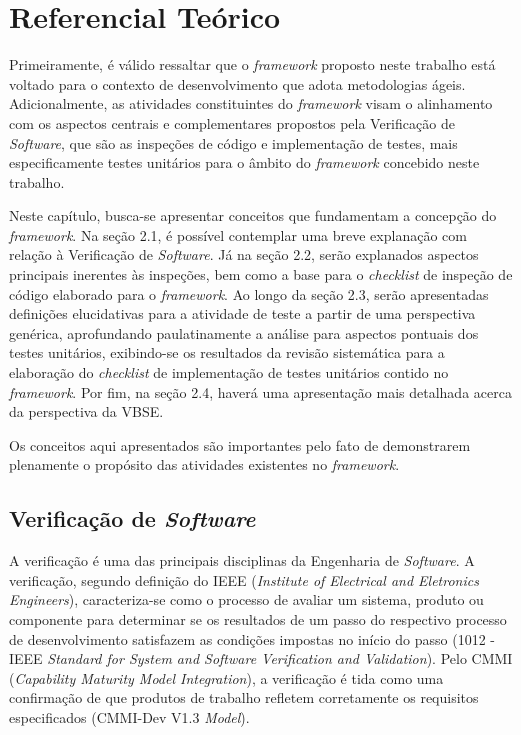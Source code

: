 \chapter{Referencial Teórico}

Primeiramente, é válido ressaltar que o \textit{framework} proposto neste trabalho está voltado para o contexto de desenvolvimento que adota metodologias ágeis. Adicionalmente, as atividades constituintes do \textit{framework} visam o alinhamento com os aspectos centrais e complementares propostos pela Verificação de \textit{Software}, que são as inspeções de código e implementação de testes, mais especificamente testes unitários para o âmbito do \textit{framework} concebido neste trabalho.

Neste capítulo, busca-se apresentar conceitos que fundamentam a concepção do \textit{framework}. Na seção 2.1, é possível contemplar uma breve explanação com relação à Verificação de \textit{Software}. Já na seção 2.2, serão explanados aspectos principais inerentes às inspeções, bem como a base para o \textit{checklist} de inspeção de código elaborado para o \textit{framework}. Ao longo da seção 2.3, serão apresentadas definições elucidativas para a atividade de teste a partir de uma perspectiva genérica, aprofundando paulatinamente a análise para aspectos pontuais dos testes unitários, exibindo-se os resultados da revisão sistemática para a elaboração do \textit{checklist} de implementação de testes unitários contido no \textit{framework}. Por fim, na seção 2.4, haverá uma apresentação mais detalhada acerca da perspectiva da VBSE.

Os conceitos aqui apresentados são importantes pelo fato de demonstrarem plenamente o propósito das atividades existentes no \textit{framework}.

\section{Verificação de \textit{Software}}

A verificação é uma das principais disciplinas da Engenharia de \textit{Software}. A verificação, segundo definição do IEEE (\textit{Institute of Electrical and Eletronics Engineers}), caracteriza-se como o processo de avaliar um sistema, produto ou componente para determinar se os resultados de um passo do respectivo processo de desenvolvimento satisfazem as condições impostas no início do passo (1012 - IEEE \textit{Standard for System and Software Verification and Validation}). Pelo CMMI (\textit{Capability Maturity Model Integration}), a verificação é tida como uma confirmação de que produtos de trabalho refletem corretamente os requisitos especificados (CMMI-Dev V1.3 \textit{Model}).

